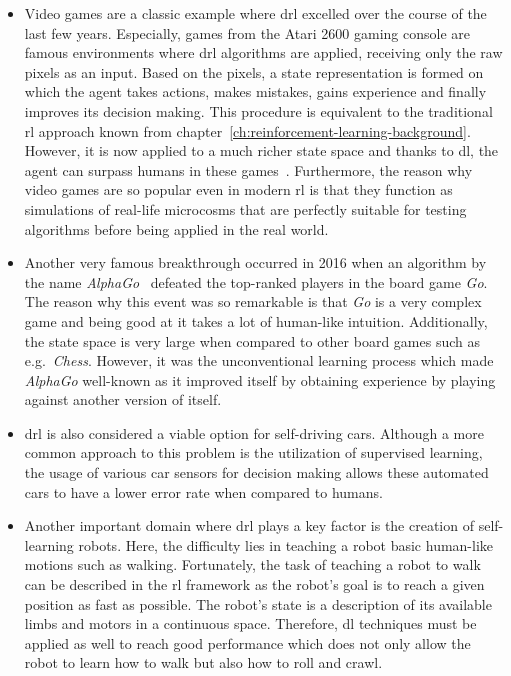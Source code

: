 \documentclass[draft,final]{vutinfth} %
\begin{document}
    \begin{itemize}
        \item Video games are a classic example where \gls{drl} excelled over the course of the last few years.
        Especially, games from the Atari 2600 gaming console are famous environments where \gls{drl} algorithms are applied, receiving only the raw pixels as an input.
        Based on the pixels, a state representation is formed on which the agent takes actions, makes mistakes, gains experience and finally improves its decision making.
        This procedure is equivalent to the traditional \gls{rl} approach known from chapter~\ref{ch:reinforcement-learning-background}.
        However, it is now applied to a much richer state space and thanks to \gls{dl}, the agent can surpass humans in these games~\citep{mnih_playing_2013,schulman_trust_2015}.
        Furthermore, the reason why video games are so popular even in modern \gls{rl} is that they function as simulations of real-life microcosms that are perfectly suitable for testing algorithms before being applied in the real world.

        \item   Another very famous breakthrough occurred in 2016 when an algorithm by the name \textit{AlphaGo}~\citep{silver_mastering_2017} defeated the top-ranked players in the board game \textit{Go}.
        The reason why this event was so remarkable is that \textit{Go} is a very complex game and being good at it takes a lot of human-like intuition.
        Additionally, the state space is very large when compared to other board games such as e.g.\ \textit{Chess}.
        However, it was the unconventional learning process which made \textit{AlphaGo} well-known as it improved itself by obtaining experience by playing against another version of itself.

        \item   \gls{drl} is also considered a viable option for self-driving cars.
        Although a more common approach to this problem is the utilization of supervised learning, the usage of various car sensors for decision making allows these automated cars to have a lower error rate when compared to humans.
        \item   Another important domain where \gls{drl} plays a key factor is the creation of self-learning robots.
        Here, the difficulty lies in teaching a robot basic human-like motions such as walking.
        Fortunately, the task of teaching a robot to walk can be described in the \gls{rl} framework as the robot's goal is to reach a given position as fast as possible.
        The robot's state is a description of its available limbs and motors in a continuous space.
        Therefore, \gls{dl} techniques must be applied as well to reach good performance which does not only allow the robot to learn how to walk but also how to roll and crawl.
    \end{itemize}
\end{document}
